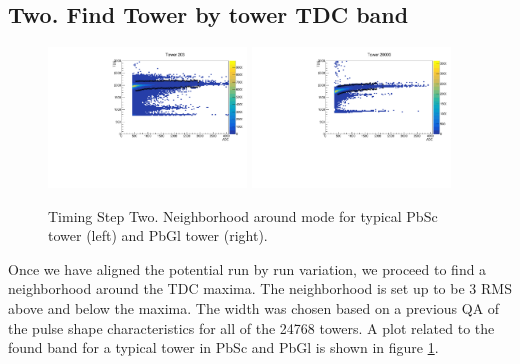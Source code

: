 \documentclass{article}
\begin{document}
\subsection{Two. Find Tower by tower TDC band}
\begin{figure}
\includegraphics[width=0.47\textwidth]{fig_pi0vn/range_t203.pdf}
\includegraphics[width=0.47\textwidth]{fig_pi0vn/range_t20003.pdf}
\caption{Timing Step Two. Neighborhood around mode for typical PbSc tower (left) and PbGl tower (right).}
\label{fig.tim.two}
\end{figure}
Once we have aligned the potential run by run variation, we proceed to find a neighborhood around the TDC maxima.
The neighborhood is set up to be 3 RMS above and below the maxima.
The width was chosen based on a previous QA of the pulse shape characteristics for all of the 24768 towers.
A plot related to the found band for a typical tower in PbSc and PbGl is shown in figure \ref{fig.tim.two}.
\end{document}
